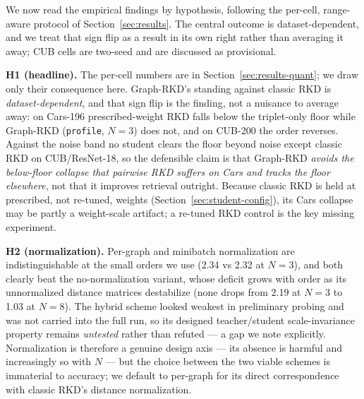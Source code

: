 \documentclass[11pt,letterpaper]{article}
\begin{document}
We now read the empirical findings by hypothesis, following the per-cell, range-aware
protocol of Section~\ref{sec:results}. The central outcome is dataset-dependent, and we
treat that sign flip as a result in its own right rather than averaging it away; CUB
cells are two-seed and are discussed as provisional.

\textbf{H1 (headline).} The per-cell numbers are in Section~\ref{sec:results-quant}; we
draw only their consequence here. Graph-RKD's standing against classic RKD is
\emph{dataset-dependent}, and that sign flip is the finding, not a nuisance to average
away: on Cars-196 prescribed-weight RKD falls below the triplet-only floor while
Graph-RKD (\texttt{profile}, $N{=}3$) does not, and on CUB-200 the order reverses. Against
the noise band no student clears the floor beyond noise except classic RKD on
CUB/ResNet-18, so the defensible claim is that Graph-RKD \emph{avoids the below-floor
collapse that pairwise RKD suffers on Cars and tracks the floor elsewhere}, not that it
improves retrieval outright. Because classic RKD is held at prescribed, not re-tuned,
weights (Section~\ref{sec:student-config}), its Cars collapse may be partly a weight-scale
artifact; a re-tuned RKD control is the key missing experiment.

\textbf{H2 (normalization).} Per-graph and minibatch normalization are indistinguishable
at the small orders we use (2.34 vs 2.32 at $N{=}3$), and both clearly beat the
no-normalization variant, whose deficit grows with order as its unnormalized distance
matrices destabilize (none drops from 2.19 at $N{=}3$ to 1.03 at $N{=}8$). The hybrid
scheme looked weakest in preliminary probing and was not carried into the full run, so
its designed teacher/student scale-invariance property remains \emph{untested} rather
than refuted --- a gap we note explicitly. Normalization is therefore a
genuine design axis --- its absence is harmful and increasingly so with $N$ --- but the
choice between the two viable schemes is immaterial to accuracy; we default to per-graph
for its direct correspondence with classic RKD's distance normalization.
\end{document}
